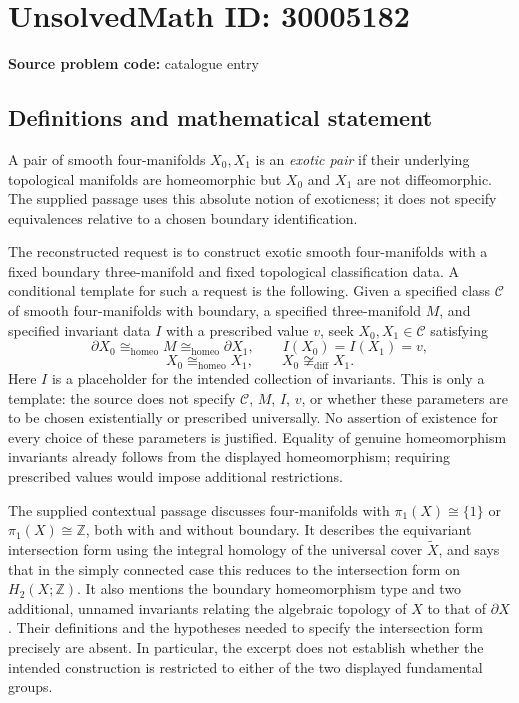 \documentclass[11pt]{article}
\newcommand{\Z}{\mathbb{Z}}
\begin{document}
\section*{UnsolvedMath ID: 30005182}
\textbf{Source problem code:} catalogue entry
\subsection{Definitions and mathematical statement}
A pair of smooth four-manifolds \(X_0,X_1\) is an \emph{exotic pair} if their underlying topological manifolds are homeomorphic but \(X_0\) and \(X_1\) are not diffeomorphic. The supplied passage uses this absolute notion of exoticness; it does not specify equivalences relative to a chosen boundary identification.

The reconstructed request is to construct exotic smooth four-manifolds with a fixed boundary three-manifold and fixed topological classification data. A conditional template for such a request is the following. Given a specified class \(\mathcal C\) of smooth four-manifolds with boundary, a specified three-manifold \(M\), and specified invariant data \(I\) with a prescribed value \(v\), seek \(X_0,X_1\in\mathcal C\) satisfying
\[
\partial X_0\cong_{\mathrm{homeo}}M\cong_{\mathrm{homeo}}\partial X_1,
\qquad I(X_0)=I(X_1)=v,
\]
\[
X_0\cong_{\mathrm{homeo}}X_1,
\qquad X_0\not\cong_{\mathrm{diff}}X_1.
\]
Here \(I\) is a placeholder for the intended collection of invariants. This is only a template: the source does not specify \(\mathcal C\), \(M\), \(I\), \(v\), or whether these parameters are to be chosen existentially or prescribed universally. No assertion of existence for every choice of these parameters is justified. Equality of genuine homeomorphism invariants already follows from the displayed homeomorphism; requiring prescribed values would impose additional restrictions.

The supplied contextual passage discusses four-manifolds with \(\pi_1(X)\cong\{1\}\) or \(\pi_1(X)\cong\Z\), both with and without boundary. It describes the equivariant intersection form using the integral homology of the universal cover \(\widetilde X\), and says that in the simply connected case this reduces to the intersection form on \(H_2(X;\Z)\). It also mentions the boundary homeomorphism type and two additional, unnamed invariants relating the algebraic topology of \(X\) to that of \(\partial X\). Their definitions and the hypotheses needed to specify the intersection form precisely are absent. In particular, the excerpt does not establish whether the intended construction is restricted to either of the two displayed fundamental groups.
\end{document}
